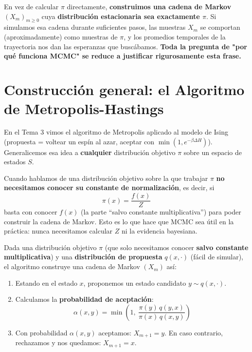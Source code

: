 \begin{observacion}
En vez de calcular $\pi$ directamente, \textbf{construimos una cadena de Markov} $(X_m)_{m\ge0}$ cuya \textbf{distribución estacionaria sea exactamente $\pi$}. Si simulamos esa cadena durante suficientes pasos, las muestras $X_m$ se comportan (aproximadamente) como muestras de $\pi$, y los promedios temporales de la trayectoria nos dan las esperanzas que buscábamos. \textbf{Toda la pregunta de "por qué funciona MCMC" se reduce a justificar rigurosamente esta frase.}
\end{observacion}

\section{Construcción general: el Algoritmo de Metropolis-Hastings}

\noindent
En el Tema 3 vimos el algoritmo de Metropolis aplicado al modelo de Ising (propuesta = voltear un espín al azar, aceptar con $\min(1,e^{-\beta\Delta H})$). Generalicemos esa idea a \textbf{cualquier} distribución objetivo $\pi$ sobre un espacio de estados $S$.

\begin{observacion}
    Cuando hablamos de una distribución objetivo sobre la que trabajar $\pi$ \textbf{no necesitamos conocer su constante de normalización}, es decir, si 
    $$\pi(x) = \dfrac{f(x)}{Z}$$ 
    basta con conocer $f(x)$ (la parte ``salvo constante multiplicativa'') para poder construir la cadena de Markov. Esto es lo que hace que MCMC sea útil en la práctica: nunca necesitamos calcular $Z$ ni la evidencia bayesiana. \\
\end{observacion}


\begin{definicion}
Dada una distribución objetivo $\pi$ (que solo necesitamos conocer \textbf{salvo constante multiplicativa}) y una \textbf{distribución de propuesta} $q(x,\cdot)$ (fácil de simular), el algoritmo construye una cadena de Markov $(X_m)$ así:
\begin{enumerate}
    \item Estando en el estado $x$, proponemos un estado candidato $y \sim q(x,\cdot)$.
    \item Calculamos la \textbf{probabilidad de aceptación}:
    \[
    \alpha(x,y) = \min\left(1,\ \frac{\pi(y)\,q(y,x)}{\pi(x)\,q(x,y)}\right)
    \]
    \item Con probabilidad $\alpha(x,y)$ aceptamos: $X_{m+1}=y$. En caso contrario, rechazamos y nos quedamos: $X_{m+1}=x$.
\end{enumerate}
\end{definicion}

